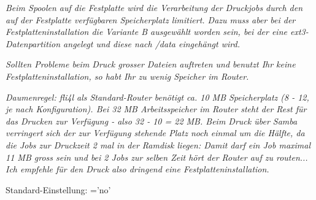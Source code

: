     \emph{Beim Spoolen auf die Festplatte wird die Verarbeitung der Druckjobs
    durch den auf der Festplatte verfügbaren Speicherplatz limitiert. Dazu
    muss aber bei der Festplatteninstallation die Variante B ausgewählt worden
    sein, bei der eine ext3-Datenpartition angelegt und diese nach /data
    eingehängt wird.}

    \emph{Sollten Probleme beim Druck grosser Dateien auftreten und benutzt Ihr keine
    Festplatteninstallation, so habt Ihr zu wenig Speicher im Router.}

    \emph{Daumenregel: fli4l als Standard-Router benötigt ca. 10 MB Speicherplatz
    (8 - 12, je nach Konfiguration). Bei 32 MB Arbeitsspeicher im Router steht
    der Rest für das Drucken zur Verfügung - also 32 - 10 = 22 MB.
    Beim Druck über Samba verringert sich der zur Verfügung stehende Platz noch
    einmal um die Hälfte, da die Jobs zur Druckzeit 2 mal in der Ramdisk liegen:
    Damit darf ein Job maximal 11 MB gross sein und bei 2 Jobs zur selben Zeit
    hört der Router auf zu routen...
    Ich empfehle für den Druck also dringend eine Festplatteninstallation.}

    Standard-Einstellung: ='no'


